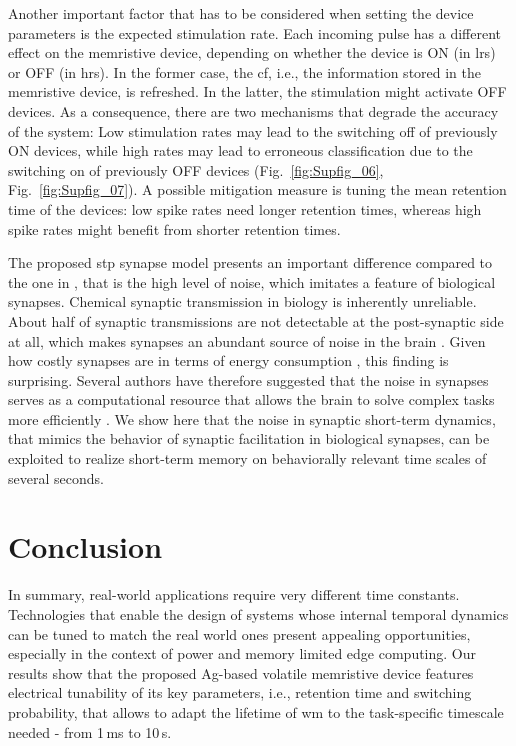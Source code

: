 Another important factor that has to be considered when setting the device parameters is the expected stimulation rate. Each incoming pulse has a different effect on the memristive device, depending on whether the device is ON (in \gls{lrs}) or OFF (in \gls{hrs}). In the former case, the \gls{cf}, i.e., the information stored in the memristive device, is refreshed. In the latter, the stimulation might activate OFF devices. As a consequence, there are two mechanisms that degrade the accuracy of the system: Low stimulation rates may lead to the switching off of previously ON devices, while high rates may lead to erroneous classification due to the switching on of previously OFF devices (Fig.~\ref{fig:Supfig_06}, Fig.~\ref{fig:Supfig_07}). A possible mitigation measure is tuning the mean retention time of the devices: low spike rates need longer retention times, whereas high spike rates might benefit from shorter retention times.

The proposed \gls{stp} synapse model presents an important difference compared to the one in \cite{zucker1989short, tsodyks1998neural}, that is the high level of noise, which imitates a feature of biological synapses. 
Chemical synaptic transmission in biology is inherently unreliable. About half of synaptic transmissions are not detectable at the post-synaptic side at all, which makes synapses an abundant source of noise in the brain \cite{rusakov2020noisy, borst2010low, jensen2019multiplex}. Given how costly synapses are in terms of energy consumption \cite{pulido2021synaptic}, this finding is surprising. Several authors have therefore suggested that the noise in synapses serves as a computational resource that allows the brain to solve complex tasks more efficiently \cite{rusakov2020noisy, maass2014noise}. We show here that the noise in synaptic short-term dynamics, that mimics the behavior of synaptic facilitation in biological synapses, can be exploited to realize short-term memory on behaviorally relevant time scales of several seconds.

\section{Conclusion}
\label{sec:concl}
In summary, real-world applications require very different time constants. Technologies that enable the design of systems whose internal temporal dynamics can be tuned to match the real world ones present appealing opportunities, especially in the context of power and memory limited edge computing. Our results show that the proposed Ag-based volatile memristive device features electrical tunability of its key parameters, i.e., retention time and switching probability, that allows to adapt the lifetime of \gls{wm} to the task-specific timescale needed - from 1\,ms to 10\,s.
